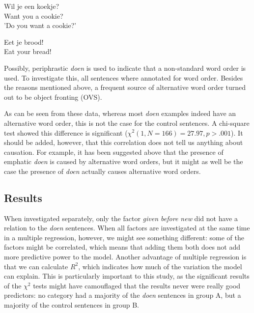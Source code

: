 \documentclass[12pt]{article}
\begin{document}
\begin{exe}
\ex \gll Wil je een koekje?\\
Want you a cookie?\\
'Do you want a cookie?'

\ex \gll Eet je brood!\\
Eat your bread!\\
\end{exe}

Possibly, periphrastic \emph{doen} is used to indicate that a non-standard word order is used. To investigate this, all sentences where annotated for word order. Besides the reasons mentioned above, a frequent source of alternative word order turned out to be object fronting (OVS).


\begin{table}[h] \footnotesize

\caption{\footnotesize Distribution of word order for the \emph{doen} sentences and the control sentences.}
\end{table}


As can be seen from these data, whereas most \emph{doen} examples indeed have an alternative word order, this is not the case for the control sentences. A chi-square test showed this difference is significant ($\chi^2(1, N=166) = 27.97, p > .001$). It should be added, however, that this correlation does not tell us anything about causation. For example, it has been suggested above that the presence of emphatic \emph{doen} is caused by alternative word orders, but it might as well be the case the presence of \emph{doen} actually causes alternative word orders.

\subsection{Results} \label{regressionresults}

When investigated separately, only the factor \emph{given before new} did not have a relation to the \emph{doen} sentences. When all factors are investigated at the same time in a multiple regression, however, we might see something different: some of the factors might be correlated, which means that adding them both does not add more predictive power to the model. Another advantage of multiple regression is that we can calculate $R^2$, which indicates how much of the variation the model can explain. This is particularly important to this study, as the significant results of the $\chi^2$ tests might have camouflaged that the results never were really good predictors: no category had a majority of the \emph{doen} sentences in group A, but a majority of the control sentences in group B.
\end{document}
